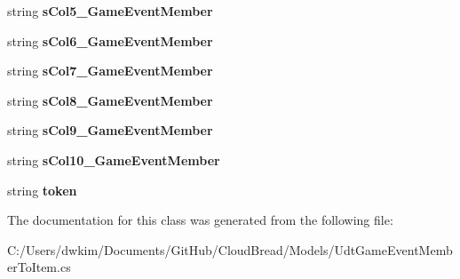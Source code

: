 \begin{DoxyCompactItemize}
\item 
string {\bfseries s\+Col5\+\_\+\+Game\+Event\+Member}\hypertarget{a00110_af6517628967e9c5f85118699aa420ae0}{}\label{a00110_af6517628967e9c5f85118699aa420ae0}

\item 
string {\bfseries s\+Col6\+\_\+\+Game\+Event\+Member}\hypertarget{a00110_a14bd1d33a38c0f780f549f29720f346d}{}\label{a00110_a14bd1d33a38c0f780f549f29720f346d}

\item 
string {\bfseries s\+Col7\+\_\+\+Game\+Event\+Member}\hypertarget{a00110_a20ce3d402158178ea8125e848ecf8c04}{}\label{a00110_a20ce3d402158178ea8125e848ecf8c04}

\item 
string {\bfseries s\+Col8\+\_\+\+Game\+Event\+Member}\hypertarget{a00110_a4e626043b6fafcb9316124aa6dcdada6}{}\label{a00110_a4e626043b6fafcb9316124aa6dcdada6}

\item 
string {\bfseries s\+Col9\+\_\+\+Game\+Event\+Member}\hypertarget{a00110_ad1f73e1bc62ef1fcfd19dcf9f40decf0}{}\label{a00110_ad1f73e1bc62ef1fcfd19dcf9f40decf0}

\item 
string {\bfseries s\+Col10\+\_\+\+Game\+Event\+Member}\hypertarget{a00110_a8e13098d330fa0ac4dc51e950148a4e2}{}\label{a00110_a8e13098d330fa0ac4dc51e950148a4e2}

\item 
string {\bfseries token}\hypertarget{a00110_ab3665baab02f27eb24894a72545390eb}{}\label{a00110_ab3665baab02f27eb24894a72545390eb}

\end{DoxyCompactItemize}


The documentation for this class was generated from the following file\+:\begin{DoxyCompactItemize}
\item 
C\+:/\+Users/dwkim/\+Documents/\+Git\+Hub/\+Cloud\+Bread/\+Models/Udt\+Game\+Event\+Member\+To\+Item.\+cs\end{DoxyCompactItemize}
